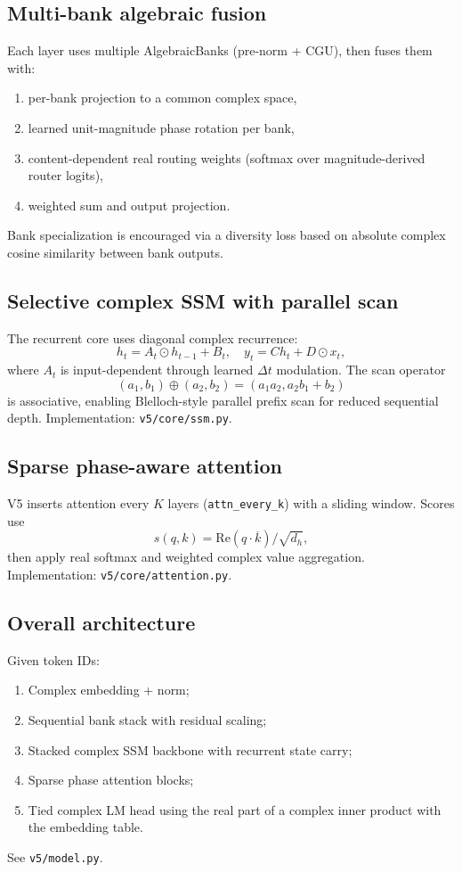 \documentclass[11pt]{article}
\begin{document}
\subsection{Multi-bank algebraic fusion}
Each layer uses multiple AlgebraicBanks (pre-norm + CGU), then fuses them with:
\begin{enumerate}[leftmargin=1.2em]
  \item per-bank projection to a common complex space,
  \item learned unit-magnitude phase rotation per bank,
  \item content-dependent real routing weights (softmax over magnitude-derived router logits),
  \item weighted sum and output projection.
\end{enumerate}
Bank specialization is encouraged via a diversity loss based on absolute complex cosine similarity between bank outputs.

\subsection{Selective complex SSM with parallel scan}
The recurrent core uses diagonal complex recurrence:
\begin{equation}
  h_t = A_t \odot h_{t-1} + B_t,\quad y_t = C h_t + D \odot x_t,
\end{equation}
where $A_t$ is input-dependent through learned $\Delta t$ modulation.
The scan operator
\begin{equation}
  (a_1,b_1)\oplus(a_2,b_2)=(a_1a_2, a_2b_1+b_2)
\end{equation}
is associative, enabling Blelloch-style parallel prefix scan \citep{blelloch1990prefix} for reduced sequential depth.
Implementation: \texttt{v5/core/ssm.py}.

\subsection{Sparse phase-aware attention}
V5 inserts attention every $K$ layers (\texttt{attn\_every\_k}) with a sliding window.
Scores use
\begin{equation}
  s(q,k)=\mathrm{Re}(q\cdot \overline{k})/\sqrt{d_h},
\end{equation}
then apply real softmax and weighted complex value aggregation.
Implementation: \texttt{v5/core/attention.py}.

\subsection{Overall architecture}
Given token IDs:
\begin{enumerate}[leftmargin=1.2em]
  \item Complex embedding + norm;
  \item Sequential bank stack with residual scaling;
  \item Stacked complex SSM backbone with recurrent state carry;
  \item Sparse phase attention blocks;
  \item Tied complex LM head using the real part of a complex inner product with the embedding table.
\end{enumerate}
See \texttt{v5/model.py}.
\end{document}
